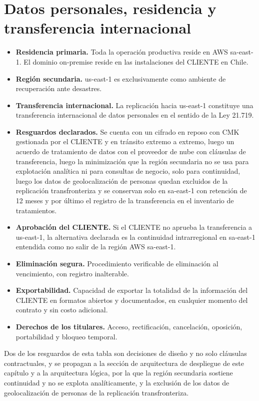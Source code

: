 \section{Datos personales, residencia y transferencia internacional}
\label{sub:10-datos-personales-residencia-y-transfere}

\begin{itemize}
  \item \textbf{Residencia primaria.} Toda la operación productiva reside en AWS sa-east-1. El dominio on-premise reside en las instalaciones del CLIENTE en Chile.
  \item \textbf{Región secundaria.} us-east-1 es exclusivamente como ambiente de recuperación ante desastres.
  \item \textbf{Transferencia internacional.} La replicación hacia us-east-1 constituye una transferencia internacional de datos personales en el sentido de la Ley 21.719.
  \item \textbf{Resguardos declarados.} Se cuenta con un cifrado en reposo con CMK gestionada por el CLIENTE y en tránsito extremo a extremo, luego un acuerdo de tratamiento de datos con el proveedor de nube con cláusulas de transferencia, luego la minimización que la región secundaria no se usa para explotación analítica ni para consultas de negocio, solo para continuidad, luego los datos de geolocalización de personas quedan excluidos de la replicación transfronteriza y se conservan solo en sa-east-1 con retención de 12 meses y por último el registro de la transferencia en el inventario de tratamientos.
  \item \textbf{Aprobación del CLIENTE.} Si el CLIENTE no aprueba la transferencia a us-east-1, la alternativa declarada es la continuidad intrarregional en sa-east-1 entendida como no salir de la región AWS sa-east-1.
  \item \textbf{Eliminación segura.} Procedimiento verificable de eliminación al vencimiento, con registro inalterable.
  \item \textbf{Exportabilidad.} Capacidad de exportar la totalidad de la información del CLIENTE en formatos abiertos y documentados, en cualquier momento del contrato y sin costo adicional.
  \item \textbf{Derechos de los titulares.} Acceso, rectificación, cancelación, oposición, portabilidad y bloqueo temporal.
\end{itemize}

Dos de los resguardos de esta tabla son decisiones de diseño y no solo cláusulas contractuales, y se propagan a la sección de arquitectura de despliegue de este capítulo y a la arquitectura lógica, por la que la región secundaria sostiene continuidad y no se explota analíticamente, y la exclusión de los datos de geolocalización de personas de la replicación transfronteriza.

